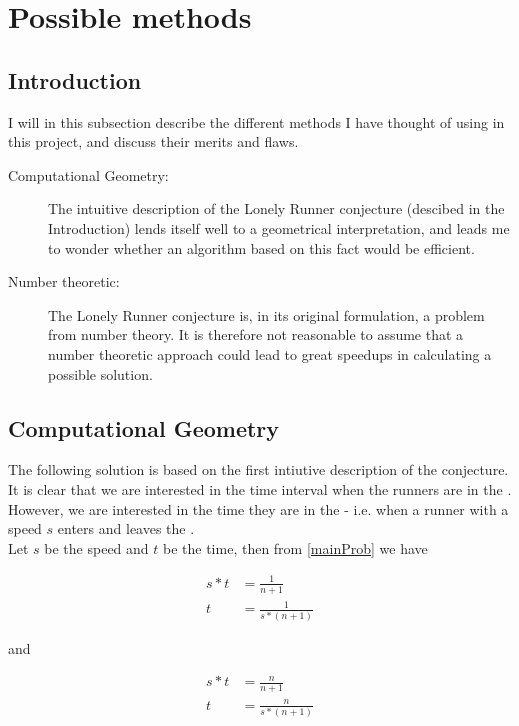 \section{Possible methods}
\label{choiceOfMethod}

\subsection{Introduction}
I will in this subsection describe the different methods I have thought of using in this project, and discuss their merits and flaws.

\begin{description}
\item[Computational Geometry:] The intuitive description of the Lonely Runner conjecture (descibed in the Introduction) lends itself well to a geometrical interpretation, and leads me to wonder whether an algorithm based on this fact would be efficient.

\item[Number theoretic:] The Lonely Runner conjecture is, in its original formulation, a problem from number theory. It is therefore not reasonable to assume that a number theoretic approach could lead to great speedups in calculating a possible solution.
\end{description}

\subsection{Computational Geometry}
The following solution is based on the first intiutive description of the conjecture. It is clear that we are interested in the time interval when the runners are in the \zone. However, we are interested in the time they are in the \zone - i.e. when a runner with a speed $s$ enters and leaves the \zone.\\ 

Let $s$ be the speed and $t$ be the time, then from \ref{mainProb} we have 

\begin{equation}
\label{speedOne}
\begin{split}
s * t &= \frac{1}{n+1} \\
t &= \frac{1}{s * (n+1)}
\end{split}
\end{equation}

and 

\begin{equation}
\label{speedTwo}
\begin{split}
s * t &= \frac{n}{n+1} \\
t &= \frac{n}{s * (n+1)}
\end{split}
\end{equation}

